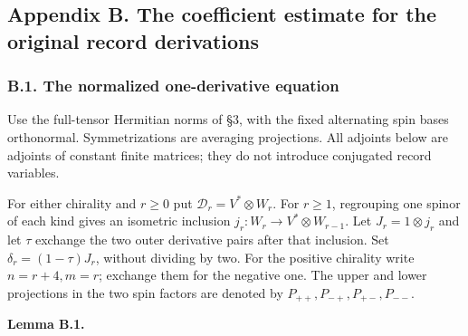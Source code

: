 \documentclass[
  english,
  11pt,
  reqno]{amsart}
\makeatletter
\newcommand{\pandocstatementheading}[1]{%
  \par\addpenalty{\@beginparpenalty}%
  \addvspace{.5\baselineskip plus .2\baselineskip minus .2\baselineskip}%
  {\normalfont\bfseries #1\par}%
  \nobreak\@afterindenttrue\@afterheading
}
\makeatother
\begin{document}
\protect{}\label{app:gg-record-budget}

\subsection{Appendix B. The coefficient estimate for the original record
derivations}\label{appendix-b.-the-coefficient-estimate-for-the-original-record-derivations}

\protect{}\label{sec:gg-budget-recursion}

\subsubsection{B.1. The normalized one-derivative
equation}\label{b.1.-the-normalized-one-derivative-equation}

Use the full-tensor Hermitian norms of §3, with the fixed alternating
spin bases orthonormal. Symmetrizations are averaging projections. All
adjoints below are adjoints of constant finite matrices; they do not
introduce conjugated record variables.

For either chirality and \(r\ge0\) put \(\mathcal D_r=V^*\otimes W_r\).
For \(r\ge1\), regrouping one spinor of each kind gives an isometric
inclusion \(j_r:W_r\to V^*\otimes W_{r-1}\). Let \(J_r=1\otimes j_r\)
and let \(\tau\) exchange the two outer derivative pairs after that
inclusion. Set \(\delta_r=(1-\tau)J_r\), without dividing by two. For
the positive chirality write \(n=r+4,m=r\); exchange them for the
negative one. The upper and lower projections in the two spin factors
are denoted by \(P_{++},P_{-+},P_{+-},P_{--}\).

\pandocstatementheading{\protect{}\label{lem:gg-budget-spencer}Lemma B.1.}
\end{document}
